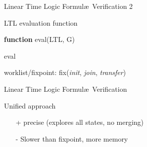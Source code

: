 \begin{frame}{Linear Time Logic Formul\ae\ Verification 2}
  \begin{block}{LTL evaluation function}

    \scriptsize
  \begin{algorithm}[H]
    \SetLine
    \textbf{function} eval(LTL, G)\\
      
      \caption{eval}
    \end{algorithm}

    \medskip

    worklist/fixpoint:  fix(\emph{init}, \emph{join}, \emph{transfer})
  \end{block}
\end{frame}
\newcommand{\ffalse}{\ensuremath{\mathit{false}}}
\newcommand{\ttrue}{\ensuremath{\mathit{true}}}




\begin{frame}{Linear Time Logic Formul\ae\ Verification}

  \begin{block}{Unified approach}
    \begin{itemize}
    \item[+] precise (explores all states, no merging)
    \item[-] Slower than fixpoint, more memory
    \end{itemize}
  \end{block}
\end{frame}

